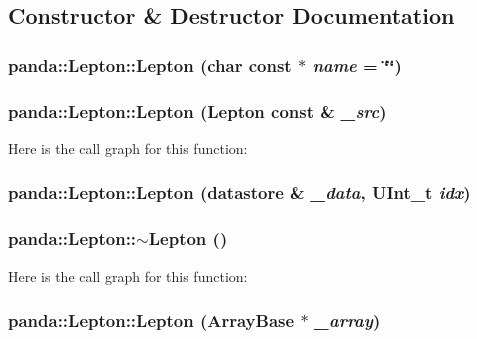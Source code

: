 \subsection{Constructor \& Destructor Documentation}
\hypertarget{classpanda_1_1Lepton_a680861ccd79a14296dbde1b00e273e53}{
\subsubsection[{Lepton}]{\setlength{\rightskip}{0pt plus 5cm}panda::Lepton::Lepton (char const $\ast$ {\em name} = {\ttfamily \char`\"{}\char`\"{}})}}
\label{classpanda_1_1Lepton_a680861ccd79a14296dbde1b00e273e53}
\hypertarget{classpanda_1_1Lepton_a60b7ecc2ad580303d527f8fb9145e6ec}{
\subsubsection[{Lepton}]{\setlength{\rightskip}{0pt plus 5cm}panda::Lepton::Lepton ({\bf Lepton} const \& {\em \_\-src})}}
\label{classpanda_1_1Lepton_a60b7ecc2ad580303d527f8fb9145e6ec}


Here is the call graph for this function:\hypertarget{classpanda_1_1Lepton_ae01f7cf754060e4b255e38059709aa16}{
\subsubsection[{Lepton}]{\setlength{\rightskip}{0pt plus 5cm}panda::Lepton::Lepton ({\bf datastore} \& {\em \_\-data}, \/  UInt\_\-t {\em idx})}}
\label{classpanda_1_1Lepton_ae01f7cf754060e4b255e38059709aa16}
\hypertarget{classpanda_1_1Lepton_a3b515cdfe0428633542031f54929f1ff}{
\subsubsection[{$\sim$Lepton}]{\setlength{\rightskip}{0pt plus 5cm}panda::Lepton::$\sim$Lepton ()}}
\label{classpanda_1_1Lepton_a3b515cdfe0428633542031f54929f1ff}


Here is the call graph for this function:\hypertarget{classpanda_1_1Lepton_af2215481b06eaaaad51a16fb19b6c53b}{
\subsubsection[{Lepton}]{\setlength{\rightskip}{0pt plus 5cm}panda::Lepton::Lepton ({\bf ArrayBase} $\ast$ {\em \_\-array})}}
\label{classpanda_1_1Lepton_af2215481b06eaaaad51a16fb19b6c53b}


